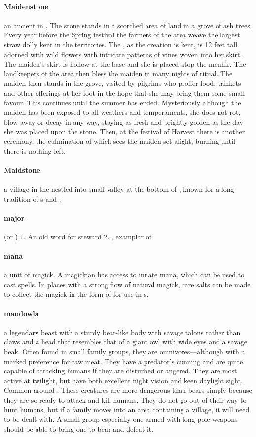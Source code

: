 \paragraph{Maidenstone} an ancient  in . The stone stands in a scorched area of land in a grove of ash trees. Every year before the Spring festival the farmers of the area weave the largest straw dolly kent in the territories. The , as the creation is kent, is 12 feet tall adorned with wild flowers with intricate patterns of vines woven into her skirt. The maiden’s skirt is hollow at the base and she is placed atop the menhir. The landkeepers of the area then bless the maiden in many nights of ritual. The maiden then stands in the grove, visited by pilgrims who proffer food, trinkets and other offerings at her foot in the hope that she may bring them some small favour. This continues until the summer has ended. \localpar Mysteriously although the maiden has been exposed to all weathers and temperaments, she does not rot, blow away or decay in any way, staying as fresh and brightly golden as the day she was placed upon the stone. Then, at the festival of Harvest there is another ceremony, the culmination of which sees the maiden set alight, burning until there is nothing left.
\paragraph{Maidstone} a village in the  nestled into small valley at the bottom of , known for a long tradition of s and .
\paragraph{major} (or ) 1. An old  word for steward 2. , examplar of 
\paragraph{mana} a unit of magick. A magickian has access to innate mana, which can be used to cast spells. In places with a strong flow of natural magick, rare salts can be made to collect the magick in the form of  for use in s.
\paragraph{mandowla} a legendary beast with a sturdy bear-like body with savage talons rather than claws and a head that resembles that of a giant owl with wide eyes and a savage beak. Often found in small family groups, they are omnivores—although with a marked preference for raw meat. They have a predator's cunning and are quite capable of attacking humans if they are disturbed or angered. They are most active at twilight, but have both excellent night vision and keen daylight sight. Common around . These creatures are more dangerous than bears simply because they are so ready to attack and kill humans. They do not go out of their way to hunt humans, but if a family moves into an area containing a village, it will need to be dealt with. A small group especially one armed with long pole weapons should be able to bring one to bear and defeat it.
